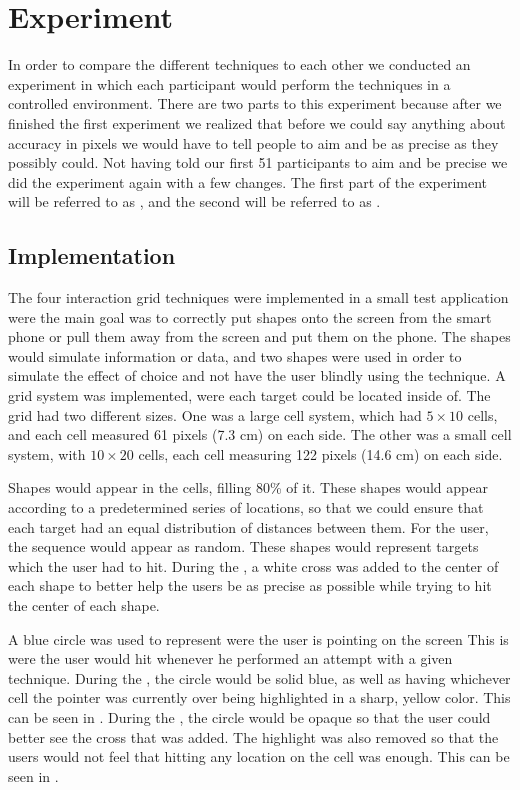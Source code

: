 \section{Experiment} \label{sec:experiment}
In order to compare the different techniques to each other we conducted an experiment in which each participant would perform the techniques in a controlled environment.
There are two parts to this experiment because after we finished the first experiment we realized that before we could say anything about accuracy in pixels we would have to tell people to aim and be as precise as they possibly could.
Not having told our first 51 participants to aim and be precise we did the experiment again with a few changes.
The first part of the experiment will be referred to as \target, and the second will be referred to as \accuracy.

\subsection{Implementation}

The four interaction grid techniques were implemented in a small test application were the main goal was to correctly put shapes onto the screen from the smart phone or pull them away from the screen and put them on the phone.
The shapes would simulate information or data, and two shapes were used in order to simulate the effect of choice and not have the user blindly using the technique. 
A grid system was implemented, were each target could be located inside of. The grid had two different sizes.
One was a large cell system, which had $5\times10$ cells, and each cell measured 61 pixels (7.3 cm) on each side.
The other was a small cell system, with $10\times20$ cells, each cell measuring 122 pixels (14.6 cm)  on each side. 

Shapes would appear in the cells, filling 80\% of it. 
These shapes would appear according to a predetermined series of locations, so that we could ensure that each target had an equal distribution of distances between them. 
For the user, the sequence would appear as random. 
These shapes would represent targets which the user had to hit.
During the \accuracy, a white cross was added to the center of each shape to better help the users be as precise as possible while trying to hit the center of each shape.

A blue circle was used to represent were the user is pointing on the screen
This is were the user would hit whenever he performed an attempt with a given technique.
During the \target, the circle would be solid blue, as well as having whichever cell the pointer was currently over being highlighted in a sharp, yellow color.
This can be seen in .
During the \accuracy, the circle would be opaque so that the user could better see the cross that was added.
The highlight was also removed so that the users would not feel that hitting any location on the cell was enough. 
This can be seen in .

